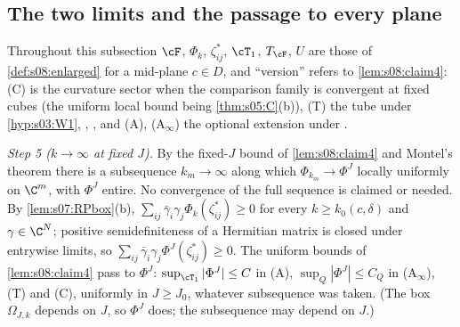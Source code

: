 \subsection{The two limits and the passage to every plane}

Throughout this subsection $\cF$, $\Phi_k$, $\zeta^*_{ij}$, $\cT_1$, $T_\cF$, $U$ are those of \cref{def:s08:enlarged} for a mid-plane $c\in D$, and ``version'' refers to \cref{lem:s08:claim4}: (C) is the curvature sector when the comparison family is convergent at fixed cubes (the uniform local bound being \cref{thm:s05:C}(b)), (T) the tube under \cref{hyp:s03:W1}, \Itwo, \Ithree, and (A), (A$_\infty$) the optional extension under \Wtwo.

\emph{Step 5 ($k\to\infty$ at fixed $J$).} By the fixed-$J$ bound of \cref{lem:s08:claim4} and Montel's theorem there is a subsequence $k_m\to\infty$ along which $\Phi_{k_m}\to\Phi^J$ locally uniformly on $\C^m$, with $\Phi^J$ entire. No convergence of the full sequence is claimed or needed. By \cref{lem:s07:RPbox}(b), $\sum_{ij}\bar\gamma_i\gamma_j\Phi_k(\zeta^*_{ij})\ge0$ for every $k\ge k_0(c,\delta)$ and $\gamma\in\C^N$; positive semidefiniteness of a Hermitian matrix is closed under entrywise limits, so $\sum_{ij}\bar\gamma_i\gamma_j\Phi^J(\zeta^*_{ij})\ge0$. The uniform bounds of \cref{lem:s08:claim4} pass to $\Phi^J$: $\sup_{\cT_1}|\Phi^J|\le C$ in (A), $\sup_Q|\Phi^J|\le C_Q$ in (A$_\infty$), (T) and (C), uniformly in $J\ge J_0$, whatever subsequence was taken. (The box $\Omega_{J,k}$ depends on $J$, so $\Phi^J$ does; the subsequence may depend on $J$.)

